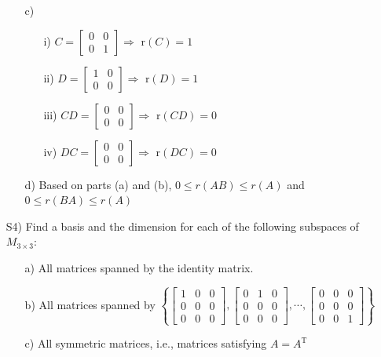 \documentclass[12pt]{article}
\begin{document}
\begin{itemize}
\begin{itemize}
\item[c)] \begin{itemize}
	\item[i)] $C = \left[\begin{array}{ccc} 0 & 0\\ 0 & 1\end{array}\right]
    		   \Rightarrow$ r$(C)=1$
    \item[ii)] $D = \left[\begin{array}{ccc}  1 & 0\\ 0  & 0\end{array}\right]
    		   \Rightarrow$ r$(D)=1$
    \item[iii)] $CD = \left[\begin{array}{ccc} 0 & 0\\ 0 & 0\end{array}\right]
    		  \Rightarrow$ r$(CD)=0$
    \item[iv)] $DC =\left[\begin{array}{ccc} 0 & 0\\ 0  & 0\end{array}\right]
    		   \Rightarrow$ r$(DC)=0$
	\end{itemize}
\item[d)] Based on parts (a) and (b), $0 \leq r(AB) \leq r(A)$ and $0 \leq r(BA) \leq r(A)$
\end{itemize}

\item[S4)] Find a basis and the dimension for each of the following subspaces of $M_{3\times3}$:
\begin{itemize}
\item[a)] All matrices spanned by the identity matrix. 
\item[b)] All matrices spanned by $\left\{\left[\begin{array}{ccc} 1 & 0 & 0\\ 0 & 0 &0 \\ 0& 0& 0\end{array}\right], \left[\begin{array}{ccc} 0 & 1 & 0\\ 0 & 0 & 0\\ 0& 0& 0\end{array}\right], \cdots, \left[\begin{array}{ccc} 0 & 0 & 0\\ 0 & 0 & 0\\ 0& 0& 1\end{array}\right]\right\}$
\item[c)] All symmetric matrices, i.e., matrices satisfying $A=A^\text{T}$
\end{itemize}


\end{itemize}
\end{document}
